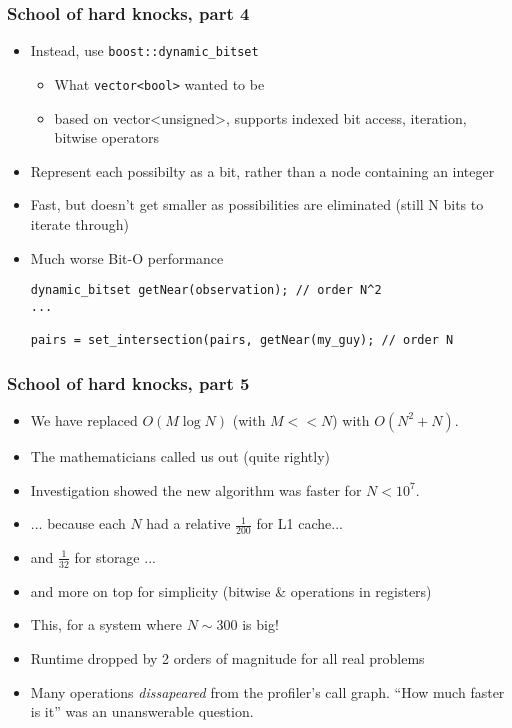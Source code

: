 \begin{frame}[fragile]
\frametitle{School of hard knocks, part 4}

\begin{itemize}[<+->]
\item Instead, use \texttt{boost::dynamic\_bitset}
  \begin{itemize}
  \item What \texttt{vector<bool>} wanted to be
  \item based on vector<unsigned>, supports indexed bit access,
    iteration, bitwise operators
  \end{itemize}
\item Represent each possibilty as a bit, rather than a node
  containing an integer
\item Fast, but doesn't get smaller as possibilities are eliminated
  (still N bits to iterate through)
\item Much worse Bit-O performance
{\scriptsize\begin{verbatim}
dynamic_bitset getNear(observation); // order N^2
...

pairs = set_intersection(pairs, getNear(my_guy); // order N
\end{verbatim}
}
\end{itemize}
\end{frame}


\begin{frame}[fragile]
\frametitle{School of hard knocks, part 5}
\begin{itemize}[<+->]
\item We have replaced $O(M \log N)$ (with $M << N$) with
  $O(N^2 + N)$.
\item The mathematicians called us out (quite rightly)
\item Investigation showed the new algorithm was faster for $N < 10^7$.
\item ... because each $N$ had a relative $\frac{1}{200}$ for L1
  cache...
\item and $\frac{1}{32}$ for storage ...
\item and more on top for simplicity (bitwise \& operations in
  registers)
  \item This, for a system where $N \sim 300$ is big!
\item Runtime dropped by 2 orders of magnitude for all real problems
\item Many operations \emph{dissapeared} from the profiler's call
  graph.  ``How much faster is it'' was an unanswerable question.
\end{itemize}
\end{frame}



